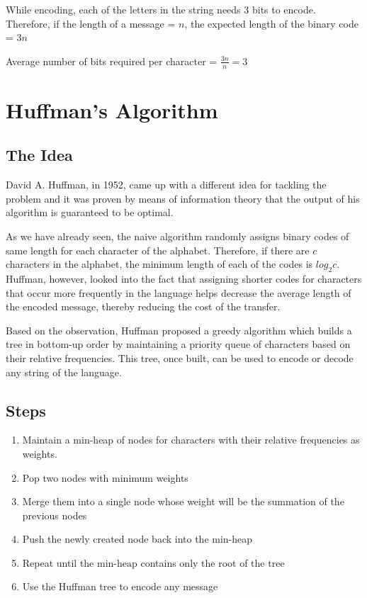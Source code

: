 \documentclass[18pt]{article}
\begin{document}
	While encoding, each of the letters in the string needs 3 bits to encode. Therefore, if the length of a message = $n$, the expected length of the binary code = $3n$
	
	Average number of bits required per character = $\frac{3n}{n} = 3$
	
	\newpage
	
	\section{Huffman's Algorithm}
	
	\subsection{The Idea}
	
	David A. Huffman, in 1952, came up with a different idea for tackling the problem and it was proven by means of information theory that the output of his algorithm is guaranteed to be optimal. 
	
	As we have already seen, the naive algorithm randomly assigns binary codes of same length for each character of the alphabet. Therefore, if there are $c$ characters in the alphabet, the minimum length of each of the codes is $log_{2}{c}$. Huffman, however, looked into the fact that assigning shorter codes for characters that occur more frequently in the language helps decrease the
	average length of the encoded message, thereby reducing the cost of the transfer.
	
	Based on the observation, Huffman proposed a greedy algorithm which builds a tree in bottom-up order by maintaining a priority queue of characters based on their relative frequencies. This tree, once built, can be used to encode or decode any string of the language.
	
	\subsection{Steps}
	
	\begin{enumerate}
		\item Maintain a min-heap of nodes for characters with their relative frequencies as weights. 
		
		\item Pop two nodes with minimum weights 
		
		\item Merge them into a single node whose weight will be the summation of the previous nodes
		
		\item Push the newly created node back into the min-heap
		
		\item Repeat until the min-heap contains only the root of the tree
		
		\item Use the Huffman tree to encode any message
		
	\end{enumerate}
	
\end{document}
